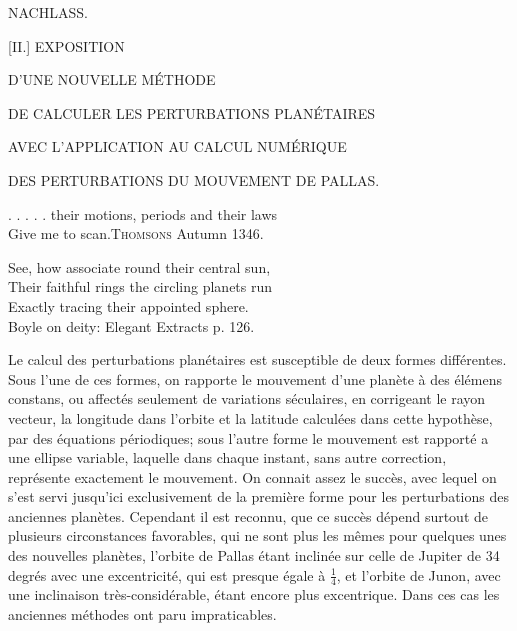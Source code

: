 \clearpage
{}
\begin{center}
{\Large NACHLASS.\par}
\bigskip
{\large [II.] EXPOSITION\par}
{\large D’UNE NOUVELLE MÉTHODE\par}
DE CALCULER LES PERTURBATIONS PLANÉTAIRES\par
AVEC L’APPLICATION AU CALCUL NUMÉRIQUE\par
DES PERTURBATIONS DU MOUVEMENT DE PALLAS.
\end{center}
\begin{flushright}
\begin{minipage}{.94\textwidth}
\small\raggedright
. . . . . their motions, periods and their laws\\
Give me to scan.\quad \textsc{Thomsons} Autumn 1346.
\par\medskip
See, how associate round their central sun,\\
Their faithful rings the circling planets run\\
Exactly tracing their appointed sphere.\\
\hspace*{1em}Boyle on deity: Elegant Extracts p. 126.
\end{minipage}
\end{flushright}
\noindent\hspace*{\parindent}Le calcul des perturbations planétaires est susceptible de deux formes différentes. Sous l’une de ces formes, on rapporte le mouvement d’une planète à des élémens constans, ou affectés seulement de variations séculaires, en corrigeant le rayon vecteur, la longitude dans l’orbite et la latitude calculées dans cette hypothèse, par des équations périodiques; sous l’autre forme le mouvement est rapporté a une ellipse variable, laquelle dans chaque instant, sans autre correction, représente exactement le mouvement. On connait assez le succès, avec lequel on s’est servi jusqu’ici exclusivement de la première forme pour les perturbations des anciennes planètes. Cependant il est reconnu, que ce succès dépend surtout de plusieurs circonstances favorables, qui ne sont plus les mêmes pour quelques unes des nouvelles planètes, l’orbite de Pallas étant inclinée sur celle de Jupiter de 34 degrés avec une excentricité, qui est presque égale à \(\frac{1}{4}\), et l’orbite de Junon, avec une inclinaison très-considérable, étant encore plus excentrique. Dans ces cas les anciennes méthodes ont paru impraticables.
